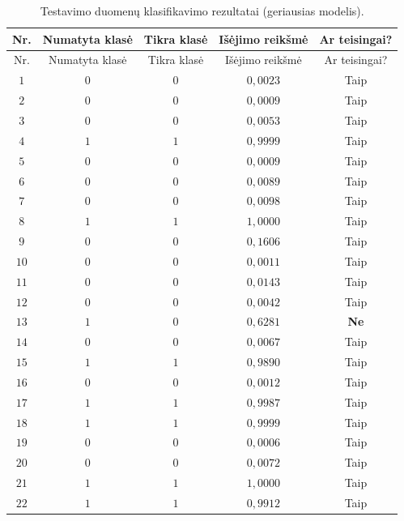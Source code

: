 \begin{longtable}{ccccc}
    \caption{Testavimo duomenų klasifikavimo rezultatai (geriausias modelis).}
    \label{tab:test_predictions} \\
    \toprule
    Nr. & Numatyta klasė & Tikra klasė & Išėjimo reikšmė & Ar teisingai? \\
    \midrule
    \endfirsthead
    
    \toprule
    Nr. & Numatyta klasė & Tikra klasė & Išėjimo reikšmė & Ar teisingai? \\
    \midrule
    \endhead
    
    \bottomrule
    \endfoot
    
    \bottomrule
    \endlastfoot

    $1$ & $0$ & $0$ & $0{,}0023$ & Taip \\
    $2$ & $0$ & $0$ & $0{,}0009$ & Taip \\
    $3$ & $0$ & $0$ & $0{,}0053$ & Taip \\
    $4$ & $1$ & $1$ & $0{,}9999$ & Taip \\
    $5$ & $0$ & $0$ & $0{,}0009$ & Taip \\
    $6$ & $0$ & $0$ & $0{,}0089$ & Taip \\
    $7$ & $0$ & $0$ & $0{,}0098$ & Taip \\
    $8$ & $1$ & $1$ & $1{,}0000$ & Taip \\
    $9$ & $0$ & $0$ & $0{,}1606$ & Taip \\
    $10$ & $0$ & $0$ & $0{,}0011$ & Taip \\
    $11$ & $0$ & $0$ & $0{,}0143$ & Taip \\
    $12$ & $0$ & $0$ & $0{,}0042$ & Taip \\
    \rowcolor{pink} $13$ & $1$ & $0$ & $0{,}6281$ & \textbf{Ne} \\
    $14$ & $0$ & $0$ & $0{,}0067$ & Taip \\
    $15$ & $1$ & $1$ & $0{,}9890$ & Taip \\
    $16$ & $0$ & $0$ & $0{,}0012$ & Taip \\
    $17$ & $1$ & $1$ & $0{,}9987$ & Taip \\
    $18$ & $1$ & $1$ & $0{,}9999$ & Taip \\
    $19$ & $0$ & $0$ & $0{,}0006$ & Taip \\
    $20$ & $0$ & $0$ & $0{,}0072$ & Taip \\
    $21$ & $1$ & $1$ & $1{,}0000$ & Taip \\
    $22$ & $1$ & $1$ & $0{,}9912$ & Taip \\

\end{longtable}
